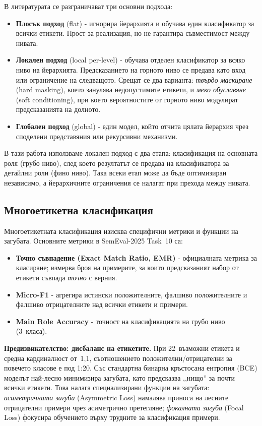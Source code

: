 \documentclass[12pt,a4paper]{report}
\begin{document}
В литературата се разграничават три основни подхода:
\begin{itemize}
  \item \textbf{Плосък подход} (flat) - игнорира йерархията и обучава един класификатор за всички етикети. Прост за реализация, но не гарантира съвместимост между нивата.
  \item \textbf{Локален подход} (local per-level) - обучава отделен класификатор за всяко ниво на йерархията. Предсказанието на горното ниво се предава като вход или ограничение на следващото. Срещат се два варианта: \textit{твърдо маскиране} (hard masking), което занулява недопустимите етикети, и \textit{меко обуславяне} (soft conditioning), при което вероятностите от горното ниво модулират предсказанията на долното.
  \item \textbf{Глобален подход} (global) - един модел, който отчита цялата йерархия чрез споделени представяния или рекурсивни механизми.
\end{itemize}

В тази работа използваме локален подход с два етапа: класификация на основната роля (грубо ниво), след което резултатът се предава на класификатора за детайлни роли (фино ниво). Така всеки етап може да бъде оптимизиран независимо, а йерархичните ограничения се налагат при прехода между нивата.

\subsection{Многоетикетна класификация}

Многоетикетната класификация изисква специфични метрики и функции на загубата. Основните метрики в SemEval-2025 Task~10 са:
\begin{itemize}
  \item \textbf{Точно съвпадение (Exact Match Ratio, EMR)} - официалната метрика за класиране; измерва броя на примерите, за които предсказаният набор от етикети съвпада \textit{точно} с верния.
  \item \textbf{Micro-F1} - агрегира истински положителните, фалшиво положителните и фалшиво отрицателните над всички етикети и примери.
  \item \textbf{Main Role Accuracy} - точност на класификацията на грубо ниво (3~класа).
\end{itemize}

\textbf{Предизвикателство: дисбаланс на етикетите.} При 22~възможни етикета и средна кардиналност от~1,1, съотношението положителни/отрицателни за повечето класове е под 1:20. Със стандартна бинарна кръстосана ентропия (BCE) моделът най-лесно минимизира загубата, като предсказва ,,нищо'' за почти всички етикети. Това налага специализирани функции на загубата: \textit{асиметричната загуба} (Asymmetric Loss) намалява приноса на лесните отрицателни примери чрез асиметрично претегляне; \textit{фокалната загуба} (Focal Loss) фокусира обучението върху трудните за класификация примери.
\end{document}
